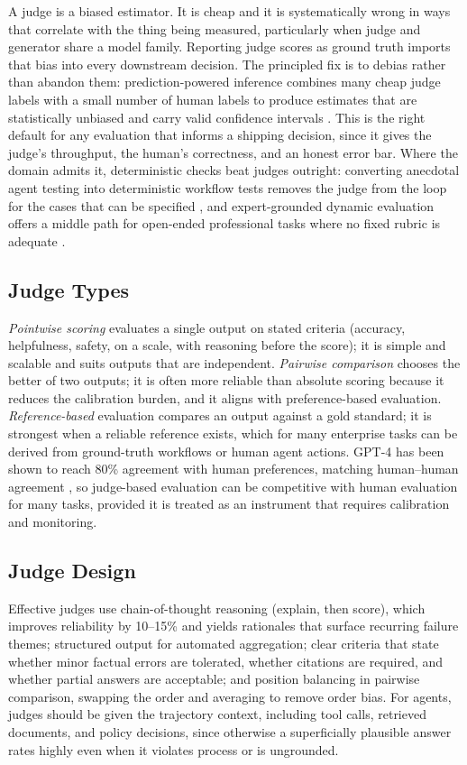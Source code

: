\documentclass[11pt]{book}
\begin{document}
A judge is a biased estimator. It is cheap and it is systematically wrong in ways that correlate with the thing being measured, particularly when judge and generator share a model family. Reporting judge scores as ground truth imports that bias into every downstream decision. The principled fix is to debias rather than abandon them: prediction-powered inference combines many cheap judge labels with a small number of human labels to produce estimates that are statistically unbiased and carry valid confidence intervals \cite{glide2026}. This is the right default for any evaluation that informs a shipping decision, since it gives the judge's throughput, the human's correctness, and an honest error bar. Where the domain admits it, deterministic checks beat judges outright: converting anecdotal agent testing into deterministic workflow tests removes the judge from the loop for the cases that can be specified \cite{aeval2026}, and expert-grounded dynamic evaluation offers a middle path for open-ended professional tasks where no fixed rubric is adequate \cite{jade2026}.

\subsection{Judge Types}

\textit{Pointwise scoring} evaluates a single output on stated criteria (accuracy, helpfulness, safety, on a scale, with reasoning before the score); it is simple and scalable and suits outputs that are independent. \textit{Pairwise comparison} chooses the better of two outputs; it is often more reliable than absolute scoring because it reduces the calibration burden, and it aligns with preference-based evaluation. \textit{Reference-based} evaluation compares an output against a gold standard; it is strongest when a reliable reference exists, which for many enterprise tasks can be derived from ground-truth workflows or human agent actions. GPT-4 has been shown to reach 80\% agreement with human preferences, matching human--human agreement \cite{llmasjudge2023}, so judge-based evaluation can be competitive with human evaluation for many tasks, provided it is treated as an instrument that requires calibration and monitoring.

\subsection{Judge Design}

Effective judges \cite{llmasjudge2025} use chain-of-thought reasoning (explain, then score), which improves reliability by 10--15\% and yields rationales that surface recurring failure themes; structured output for automated aggregation; clear criteria that state whether minor factual errors are tolerated, whether citations are required, and whether partial answers are acceptable; and position balancing in pairwise comparison, swapping the order and averaging to remove order bias. For agents, judges should be given the trajectory context, including tool calls, retrieved documents, and policy decisions, since otherwise a superficially plausible answer rates highly even when it violates process or is ungrounded.
\end{document}
